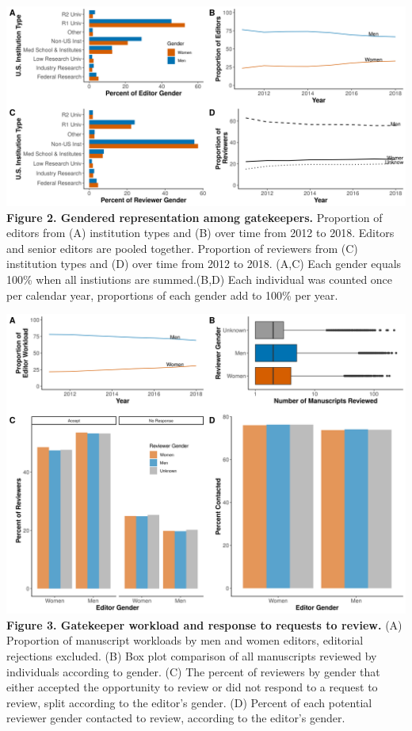 \documentclass[11pt,]{article}
\begin{document}
\newpage

\includegraphics{Figure_1.png} \textbf{Figure 2. Gendered representation
among gatekeepers.} Proportion of editors from (A) institution types and
(B) over time from 2012 to 2018. Editors and senior editors are pooled
together. Proportion of reviewers from (C) institution types and (D)
over time from 2012 to 2018. (A,C) Each gender equals 100\% when all
instiutions are summed.(B,D) Each individual was counted once per
calendar year, proportions of each gender add to 100\% per year.

\newpage

\includegraphics{Figure_2.png} \textbf{Figure 3. Gatekeeper workload and
response to requests to review.} (A) Proportion of manuscript workloads
by men and women editors, editorial rejections excluded. (B) Box plot
comparison of all manuscripts reviewed by individuals according to
gender. (C) The percent of reviewers by gender that either accepted the
opportunity to review or did not respond to a request to review, split
according to the editor's gender. (D) Percent of each potential reviewer
gender contacted to review, according to the editor's gender.
\end{document}

